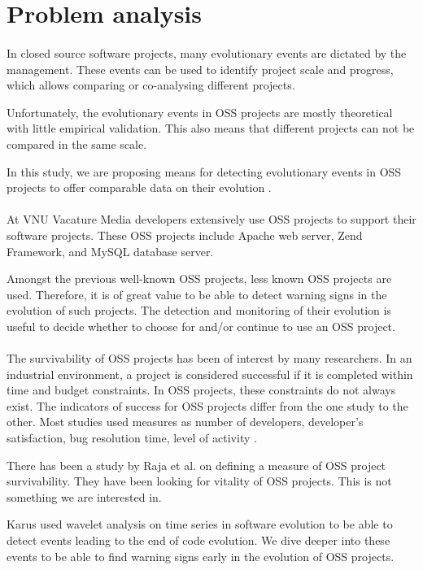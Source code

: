\section{Problem analysis}
\paragraph{}
In closed source software projects, many evolutionary events are dictated by the
management. These events can be used to identify project scale and progress,
which allows comparing or co-analysing different projects.

Unfortunately, the evolutionary events in OSS projects are mostly theoretical
with little empirical validation. This also means that different projects can
not be compared in the same scale.

In this study, we are proposing means for detecting evolutionary events in OSS
projects to offer comparable data on their evolution \cite{karus2013}.

\paragraph{}
At VNU Vacature Media developers extensively use OSS projects to support their
software projects. These OSS projects include Apache web server, Zend Framework,
and MySQL database server.

Amongst the previous well-known OSS projects, less known OSS projects are used.
Therefore, it is of great value to be able to detect warning signs in the
evolution of such projects. The detection and monitoring of their evolution is
useful to decide whether to choose for and/or continue to use an OSS project.

\paragraph{}
The survivability of OSS projects has been of interest by many researchers. In
an industrial environment, a project is considered successful if it is completed
within time and budget constraints. In OSS projects, these constraints do not
always exist. The indicators of success for OSS projects differ from the one
study to the other. Most studies used measures as number of developers,
developer's satisfaction, bug resolution time, level of activity
\cite{samoladas2010}.

There has been a study by Raja et al. \cite{raja2012} on defining a measure of
OSS project survivability. They have been looking for vitality of OSS projects.
This is not something we are interested in.

Karus used wavelet analysis on time series in software evolution to be able to
detect events leading to the end of code evolution. We dive deeper into these
events to be able to find warning signs early in the evolution of OSS projects.
